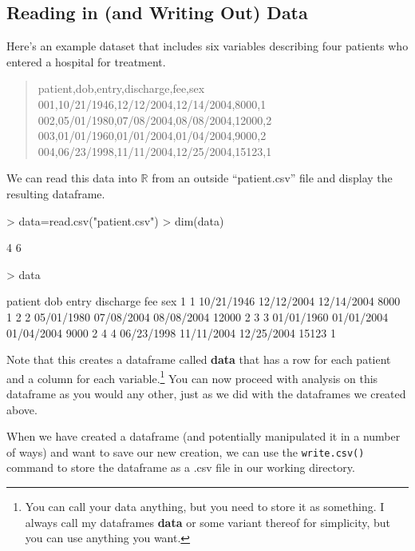 \documentclass[12pt]{article}
\begin{document}
\subsection{Reading in (and Writing Out) Data}
Here's an example dataset that includes six variables describing four patients who entered a hospital for treatment.
\begin{quote}
patient,dob,entry,discharge,fee,sex\\
001,10/21/1946,12/12/2004,12/14/2004,8000,1\\
002,05/01/1980,07/08/2004,08/08/2004,12000,2\\
003,01/01/1960,01/01/2004,01/04/2004,9000,2\\
004,06/23/1998,11/11/2004,12/25/2004,15123,1\\
\end{quote}
We can read this data into $\mathbb{R}$ from an outside ``patient.csv'' file and display the resulting dataframe.
\begin{Schunk}
\begin{Sinput}
> data=read.csv("patient.csv")
> dim(data)
\end{Sinput}
\begin{Soutput}
[1] 4 6
\end{Soutput}
\begin{Sinput}
> data
\end{Sinput}
\begin{Soutput}
  patient        dob      entry  discharge   fee sex
1       1 10/21/1946 12/12/2004 12/14/2004  8000   1
2       2 05/01/1980 07/08/2004 08/08/2004 12000   2
3       3 01/01/1960 01/01/2004 01/04/2004  9000   2
4       4 06/23/1998 11/11/2004 12/25/2004 15123   1
\end{Soutput}
\end{Schunk}
Note that this creates a dataframe called \textbf{data} that has a row for each patient and a column for each variable.\footnote{You can call your data anything, but you need to store it as something. I always call my dataframes \textbf{data} or some variant thereof for simplicity, but you can use anything you want.} You can now proceed with analysis on this dataframe as you would any other, just as we did with the dataframes we created above.

When we have created a dataframe (and potentially manipulated it in a number of ways) and want to save our new creation, we can use the \verb|write.csv()| command to store the dataframe as a .csv file in our working directory.
\end{document}
